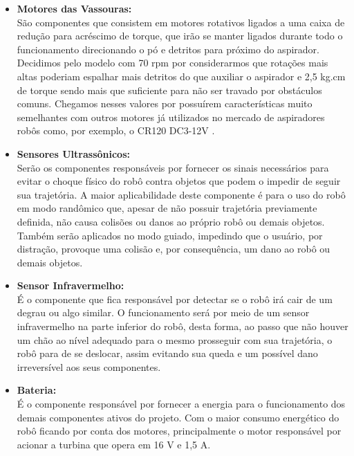 \begin{itemize}
\item\textbf{Motores das Vassouras:} \\ São componentes que consistem em motores rotativos ligados a uma caixa de redução para acréscimo de torque, que irão se manter ligados durante todo o funcionamento direcionando o pó e detritos para próximo do aspirador. Decidimos pelo modelo com 70 rpm por considerarmos que rotações mais altas poderiam espalhar mais detritos do que auxiliar o aspirador e 2,5 kg.cm de torque sendo mais que suficiente para não ser travado por obstáculos comuns. Chegamos nesses valores por possuírem características muito semelhantes com outros motores já utilizados no mercado de aspiradores robôs como, por exemplo, o CR120 DC3-12V \cite{aliexpress}.
\item \textbf{Sensores Ultrassônicos:} \\ Serão os componentes responsáveis por fornecer os sinais necessários para evitar o choque físico do robô contra objetos que podem o impedir de seguir sua trajetória. A maior aplicabilidade deste componente é para o uso do robô em modo randômico que, apesar de não possuir trajetória previamente definida, não causa colisões ou danos ao próprio robô ou demais objetos. Também serão aplicados no modo guiado, impedindo que o usuário, por distração, provoque uma colisão e, por consequência, um dano ao robô ou demais objetos.
\item\textbf{Sensor Infravermelho:} \\ É o componente que fica responsável por detectar se o robô irá cair de um degrau ou algo similar. O funcionamento será por meio de um sensor infravermelho na parte inferior do robô, desta forma, ao passo que não houver um chão ao nível adequado para o mesmo prosseguir com sua trajetória, o robô para de se deslocar, assim evitando sua queda e um possível dano irreversível aos seus componentes.
\item\textbf{Bateria:} \\ É o componente responsável por fornecer a energia para o funcionamento dos demais componentes ativos do projeto. Com o maior consumo energético do robô ficando por conta dos motores, principalmente o motor responsável por acionar a turbina que opera em 16 V e 1,5 A.


\end{itemize}
